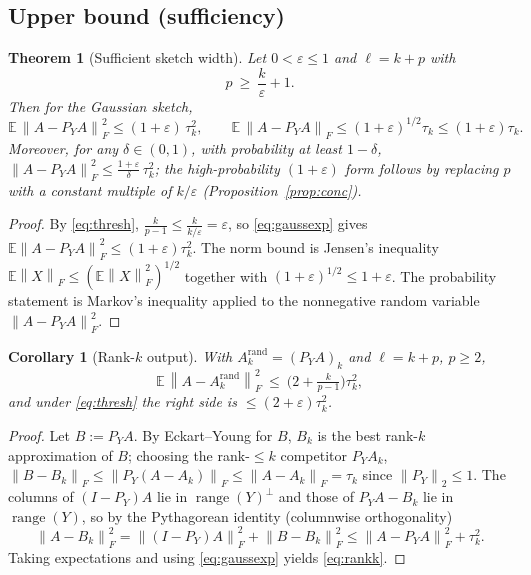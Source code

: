 \documentclass{amsart}
\newtheorem{theorem}{Theorem}
\newtheorem{corollary}{Corollary}
\theoremstyle{definition}
\DeclareMathOperator{\range}{range}
\newcommand{\Frob}[1]{\left\lVert #1\right\rVert_F}
\newcommand{\Op}[1]{\left\lVert #1\right\rVert_2}
\newcommand{\E}{\mathbb{E}}
\begin{document}
\subsection{Upper bound (sufficiency)}

\begin{theorem}[Sufficient sketch width]\label{thm:upper}
Let $0<\varepsilon\le1$ and $\ell=k+p$ with
\begin{equation}\label{eq:thresh}
p\ \ge\ \frac{k}{\varepsilon}+1 .
\end{equation}
Then for the Gaussian sketch,
\begin{equation}\label{eq:upperconc}
\E\,\Frob{A-P_Y A}^2\le(1+\varepsilon)\,\tau_k^2,\qquad
\E\,\Frob{A-P_Y A}\le(1+\varepsilon)^{1/2}\tau_k\le(1+\varepsilon)\tau_k .
\end{equation}
Moreover, for any $\delta\in(0,1)$, with probability at least $1-\delta$,
$\Frob{A-P_Y A}^2\le\frac{1+\varepsilon}{\delta}\,\tau_k^2$; the
high-probability $(1+\varepsilon)$ form follows by replacing $p$ with a constant
multiple of $k/\varepsilon$ (Proposition~\ref{prop:conc}).
\end{theorem}

\begin{proof}
By \eqref{eq:thresh}, $\frac{k}{p-1}\le\frac{k}{k/\varepsilon}=\varepsilon$, so
\eqref{eq:gaussexp} gives $\E\Frob{A-P_YA}^2\le(1+\varepsilon)\tau_k^2$. The
norm bound is Jensen's inequality $\E\Frob{X}\le(\E\Frob{X}^2)^{1/2}$ together
with $(1+\varepsilon)^{1/2}\le1+\varepsilon$. The probability statement is
Markov's inequality applied to the nonnegative random variable
$\Frob{A-P_YA}^2$.
\end{proof}

\begin{corollary}[Rank-$k$ output]\label{cor:rankk}
With $A_k^{\mathrm{rand}}=(P_YA)_k$ and $\ell=k+p$, $p\ge2$,
\begin{equation}\label{eq:rankk}
\E\,\Frob{A-A_k^{\mathrm{rand}}}^2\ \le\ \Big(2+\tfrac{k}{p-1}\Big)\tau_k^2 ,
\end{equation}
and under \eqref{eq:thresh} the right side is $\le(2+\varepsilon)\tau_k^2$.
\end{corollary}

\begin{proof}
Let $B:=P_YA$. By Eckart--Young for $B$, $B_k$ is the best rank-$k$
approximation of $B$; choosing the rank-$\le k$ competitor $P_YA_k$,
$\Frob{B-B_k}\le\Frob{P_Y(A-A_k)}\le\Frob{A-A_k}=\tau_k$ since $\Op{P_Y}\le1$.
The columns of $(I-P_Y)A$ lie in $\range(Y)^\perp$ and those of $P_YA-B_k$ lie
in $\range(Y)$, so by the Pythagorean identity (columnwise orthogonality)
\[
\Frob{A-B_k}^2=\Frob{(I-P_Y)A}^2+\Frob{B-B_k}^2
\le\Frob{A-P_YA}^2+\tau_k^2 .
\]
Taking expectations and using \eqref{eq:gaussexp} yields \eqref{eq:rankk}.
\end{proof}
\end{document}
